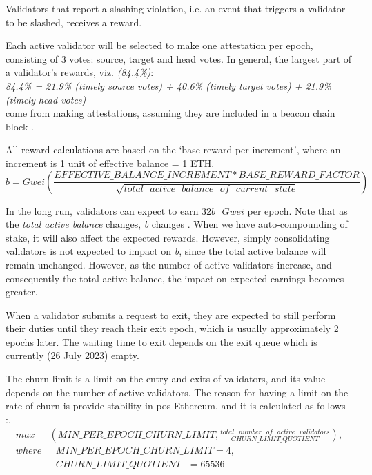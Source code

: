 \documentclass[UTF8]{article}
\begin{document}
Validators that report a slashing violation, i.e. an event that triggers a validator to be slashed, receives a reward. 

Each active validator will be selected to make one attestation per epoch, consisting of 3 votes: source, target and head votes. 
In general, the largest part of a validator's rewards, viz. \textit{(84.4\%)}: \\
\textit{84.4\% = 21.9\% (timely source votes) + 40.6\% (timely target votes) +  21.9\% (timely head votes)}\\
come from making attestations, assuming they are included in a beacon chain block \cite{Edgington2023}. 

All reward calculations are based on the `base reward per increment', where an increment is 1 unit of effective balance = 1 ETH.
\begin{equation*}
 b = Gwei \left( \frac{EFFECTIVE\_BALANCE\_INCREMENT * BASE\_REWARD\_FACTOR}{\sqrt {total \texttt{ } active \texttt{ } balance  \texttt{ } of  \texttt{ } current  \texttt{ } state}} \right)
\end{equation*}

In the long run, validators can expect to earn $32b \texttt{ } Gwei$ per epoch. Note that as the \textit{total active balance} changes, \textit{b} changes  \cite{Edgington2023}. When we have auto-compounding of stake, it will also affect the expected rewards. However, simply consolidating validators is not expected to impact on \textit{b}, since the total active balance will remain unchanged. However, as the number of active validators increase, and consequently the total active balance, the impact on expected earnings becomes greater.

When a validator submits a request to exit, they are expected to still perform their duties until they reach their exit epoch, which is usually approximately 2 epochs later. The waiting time to exit depends on the exit queue which is currently (26 July 2023) empty. 

The churn limit is a limit on the entry and exits of validators, and its value depends on the number of active validators. The reason for having a limit on the rate of churn is provide stability in \gls{pos} Ethereum, and it is calculated as follows \cite{Edgington2023}:.
\begin{equation*}
\begin{aligned}
max & \left( MIN\_PER\_EPOCH\_CHURN\_LIMIT, \frac{total \texttt{ } number  \texttt{ } of  \texttt{ } active  \texttt{ } validators}{CHURN\_LIMIT\_QUOTIENT} \right),\\
where & \texttt{ }  MIN\_PER\_EPOCH\_CHURN\_LIMIT = 4, \\
 &  \texttt{ } CHURN\_LIMIT\_QUOTIENT  \texttt{              }= 65536
\end{aligned}
\end{equation*}
\end{document}
